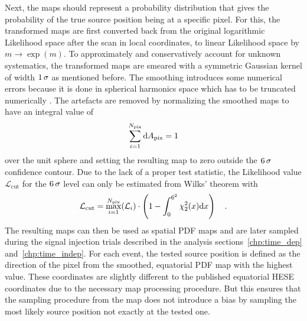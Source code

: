 Next, the maps should represent a probability distribution that gives the probability of the true source position being at a specific pixel.
For this, the transformed maps are first converted back from the original logarithmic Likelihood space after the scan in local coordinates, to linear Likelihood space by $m\rightarrow \exp{(m)}$.
To approximately and conservatively account for unknown systematics, the transformed maps are smeared with a symmetric Gaussian kernel of width $\num{1}\,\sigma$ as mentioned before.
The smoothing introduces some numerical errors because it is done in spherical harmonics space which has to be truncated numerically .
The artefacts are removed by normalizing the smoothed maps to have an integral value of
\begin{equation}
  \sum_{i=1}^{N_\text{pix}} \mathrm{d}A_\text{pix} = 1
\end{equation}
over the unit sphere and setting the resulting map to zero outside the $\num{6}\,\sigma$ confidence contour.
Due to the lack of a proper test statistic, the Likelihood value $\mathcal{L}_\text{cut}$ for the $\num{6}\,\sigma$ level can only be estimated from Wilks' theorem with
\begin{equation}
  \mathcal{L}_\text{cut} =
    \max_{i=1}^{N_\text{pix}}(\mathcal{L}_i)\cdot
    \left(1 - \int_0^{6^2}\chi^2_{2}(x)\mathrm{d}x\right)
  \quad\text{.}
\end{equation}
The resulting maps can then be used as spatial PDF maps and are later sampled during the signal injection trials described in the analysis sections~\ref{chp:time_dep} and~\ref{chp:time_indep}.
For each event, the tested source position is defined as the direction of the pixel from the smoothed, equatorial PDF map with the highest value.
These coordinates are slightly different to the published equatorial HESE coordinates due to the necessary map processing procedure.
But this ensures that the sampling procedure from the map does not introduce a bias by sampling the most likely source position not exactly at the tested one.

